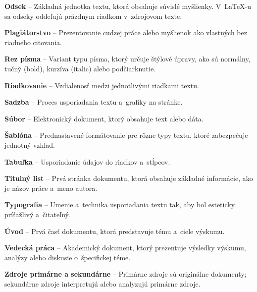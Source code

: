 \begin{trivlist}
  \item{\textbf{Odsek}} -- Základná jednotka textu, ktorá obsahuje súvislé myšlienky. V~\LaTeX-u sa odseky oddeľujú prázdnym riadkom v~zdrojovom texte.
  
  \item{\textbf{Plagiátorstvo}} -- Prezentovanie cudzej práce alebo myšlienok ako vlastných bez riadneho citovania.
  
  \item{\textbf{Rez písma}} -- Variant typu písma, ktorý určuje štýlové úpravy, ako sú normálny, tučný (bold), kurzíva (italic) alebo podčiarknutie.
  
  \item{\textbf{Riadkovanie}} -- Vzdialenosť medzi jednotlivými riadkami textu.
  
  \item{\textbf{Sadzba}} -- Proces usporiadania textu a~grafiky na stránke.
  
  \item{\textbf{Súbor}} -- Elektronický dokument, ktorý obsahuje text alebo dáta.
  
  \item{\textbf{Šablóna}} -- Prednastavené formátovanie pre rôzne typy textu, ktoré zabezpečuje jednotný vzhľad.
  
  \item{\textbf{Tabuľka}} -- Usporiadanie údajov do riadkov a~stĺpcov.
  
  \item{\textbf{Titulný list}} -- Prvá stránka dokumentu, ktorá obsahuje základné informácie, ako je názov práce a~meno autora.
  
  \item{\textbf{Typografia}} -- Umenie a~technika usporiadania textu tak, aby bol esteticky príťažlivý a~čitateľný.
  
  \item{\textbf{Úvod}} -- Prvá časť dokumentu, ktorá predstavuje tému a~ciele výskumu.
  
  \item{\textbf{Vedecká práca}} -- Akademický dokument, ktorý prezentuje výsledky výskumu, analýzy alebo diskusie o~špecifickej téme.
  
  \item{\textbf{Zdroje primárne a sekundárne}} -- Primárne zdroje sú originálne dokumenty; sekundárne zdroje interpretujú alebo analyzujú primárne zdroje.
\end{trivlist}
